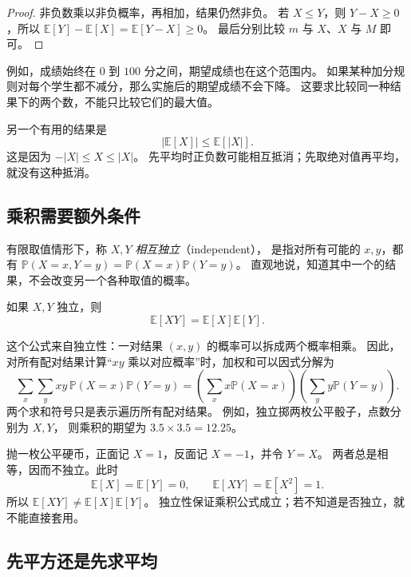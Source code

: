\documentclass[UTF8,12pt,a4paper,fontset=fandol]{ctexart}
\begin{document}
\begin{proof}
非负数乘以非负概率，再相加，结果仍然非负。
若 $X\leq Y$，则 $Y-X\geq0$，所以
$\mathbb E[Y]-\mathbb E[X]=\mathbb E[Y-X]\geq0$。
最后分别比较 $m$ 与 $X$、$X$ 与 $M$ 即可。
\end{proof}

例如，成绩始终在 $0$ 到 $100$ 分之间，期望成绩也在这个范围内。
如果某种加分规则对每个学生都不减分，那么实施后的期望成绩不会下降。
这要求比较同一种结果下的两个数，不能只比较它们的最大值。

另一个有用的结果是
\[
  |\mathbb E[X]|\leq\mathbb E[|X|].
\]
这是因为 $-|X|\leq X\leq|X|$。
先平均时正负数可能相互抵消；先取绝对值再平均，就没有这种抵消。

\subsection{乘积需要额外条件}

有限取值情形下，称 $X,Y$ \emph{相互独立}（independent），
是指对所有可能的 $x,y$，都有
$\mathbb P(X=x,Y=y)=\mathbb P(X=x)\mathbb P(Y=y)$。
直观地说，知道其中一个的结果，不会改变另一个各种取值的概率。

\begin{property}[独立变量乘积的期望]
\label{prop:basic-expectation-product}
如果 $X,Y$ 独立，则
\begin{equation}
  \mathbb E[XY]=\mathbb E[X]\mathbb E[Y].
  \label{eq:basic-expectation-product}
\end{equation}
\end{property}

这个公式来自独立性：一对结果 $(x,y)$ 的概率可以拆成两个概率相乘。
因此，对所有配对结果计算“$xy$ 乘以对应概率”时，加权和可以因式分解为
\[
  \sum_x\sum_y xy\,\mathbb P(X=x)\mathbb P(Y=y)
  =\left(\sum_x x\mathbb P(X=x)\right)
   \left(\sum_y y\mathbb P(Y=y)\right).
\]
两个求和符号只是表示遍历所有配对结果。
例如，独立掷两枚公平骰子，点数分别为 $X,Y$，
则乘积的期望为 $3.5\times3.5=12.25$。

\begin{example}[不独立时不能直接拆乘积]
\label{ex:basic-expectation-product-failure}
抛一枚公平硬币，正面记 $X=1$，反面记 $X=-1$，并令 $Y=X$。
两者总是相等，因而不独立。此时
\[
  \mathbb E[X]=\mathbb E[Y]=0,\qquad
  \mathbb E[XY]=\mathbb E[X^2]=1.
\]
所以 $\mathbb E[XY]\neq\mathbb E[X]\mathbb E[Y]$。
独立性保证乘积公式成立；若不知道是否独立，就不能直接套用。
\end{example}

\subsection{先平方还是先求平均}
\end{document}
